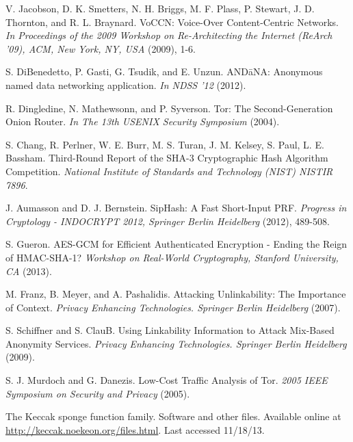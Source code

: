 \documentclass[10pt]{article}
\begin{document}
\begin{thebibliography}{[MT1]}

 V. Jacobson, D. K. Smetters, N. H. Briggs, M. F. Plass, P. Stewart, J. D. Thornton, and R. L. Braynard. VoCCN: Voice-Over Content-Centric Networks. \emph{In Proceedings of the 2009 Workshop on Re-Architecting the Internet (ReArch '09), ACM, New York, NY, USA} (2009), 1-6. 

 S. DiBenedetto, P. Gasti, G. Tsudik, and E. Unzun. {\sf AND\=aNA}: Anonymous named data networking application. \emph{In NDSS '12} (2012).

 R. Dingledine, N. Mathewsonn, and P. Syverson. Tor: The Second-Generation Onion Router. \emph{In The 13th USENIX Security Symposium} (2004).

 S. Chang, R. Perlner, W. E. Burr, M. S. Turan, J. M. Kelsey, S. Paul, L. E. Bassham. Third-Round Report of the SHA-3 Cryptographic Hash Algorithm Competition. \emph{National Institute of Standards and Technology (NIST) NISTIR 7896}.

 J. Aumasson and D. J. Bernstein. SipHash: A Fast Short-Input PRF. \emph{Progress in Cryptology - INDOCRYPT 2012, Springer Berlin Heidelberg} (2012), 489-508.

 S. Gueron. AES-GCM for Efficient Authenticated Encryption - Ending the Reign of HMAC-SHA-1? \emph{Workshop on Real-World Cryptography, Stanford University, CA} (2013).

 M. Franz, B. Meyer, and A. Pashalidis. Attacking Unlinkability: The Importance of Context. \emph{Privacy Enhancing Technologies. Springer Berlin Heidelberg} (2007).

 S. Schiffner and S. ClauB. Using Linkability Information to Attack Mix-Based Anonymity Services. \emph{Privacy Enhancing Technologies. Springer Berlin Heidelberg} (2009).

 S. J. Murdoch and G. Danezis. Low-Cost Traffic Analysis of Tor. \emph{2005 IEEE Symposium on Security and Privacy} (2005).

 The Keccak sponge function family. Software and other files. Available online at \url{http://keccak.noekeon.org/files.html}. Last accessed 11/18/13.


\end{thebibliography}
\end{document}

